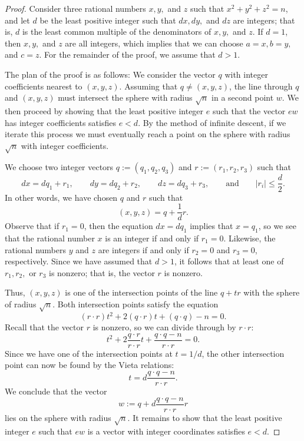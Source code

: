 \begin{proof}
  Consider three rational numbers $x, y,$ and $z$ such that $x^2+y^2+z^2=n$, and let $d$ be the least positive integer such that $dx, dy,$ and $dz$ are integers; that is, $d$ is the least common multiple of the denominators of $x, y,$ and $z$. If $d=1$, then $x, y,$ and $z$ are all integers, which implies that we can choose $a=x, b=y,$ and $c=z$. For the remainder of the proof, we assume that $d>1$.

  The plan of the proof is as follows: We consider the vector $q$ with integer coefficients nearest to $(x,y,z)$. Assuming that $q\neq (x,y,z)$, the line through $q$ and $(x,y,z)$ must intersect the sphere with radius $\sqrt{n}$ in a second point $w$. We then proceed by showing that the least positive integer $e$ such that the vector $ew$ has integer coefficients satisfies $e<d$. By the method of infinite descent, if we iterate this process we must eventually reach a point on the sphere with radius $\sqrt{n}$ with integer coefficients.

  We choose two integer vectors $q:=(q_1,q_2,q_3)$ and $r:=(r_1,r_2,r_3)$ such that
  \begin{equation*}
    dx=dq_1+r_1,\qquad dy=dq_2+r_2,\qquad dz=dq_3+r_3,\qquad\text{and}\qquad |r_i|\leq \frac{d}{2}.
  \end{equation*}
  In other words, we have chosen $q$ and $r$ such that
  \begin{equation*}
    (x,y,z)=q+\frac{1}{d}r.
  \end{equation*}
  Observe that if $r_1=0$, then the equation $dx=dq_1$ implies that $x=q_1$, so we see that the rational number $x$ is an integer if and only if $r_1=0$. Likewise, the rational numbers $y$ and $z$ are integers if and only if $r_2=0$ and $r_3=0$, respectively. Since we have assumed that $d>1$, it follows that at least one of $r_1, r_2,$ or $r_3$ is nonzero; that is, the vector $r$ is nonzero.
  
  Thus, $(x,y,z)$ is one of the intersection points of the line $q+tr$ with the sphere of radius $\sqrt{n}$. Both intersection points satisfy the equation
  \begin{equation*}
    (r\cdot r)t^2+2(q\cdot r)t+(q\cdot q)-n=0.
  \end{equation*}
  Recall that the vector $r$ is nonzero, so we can divide through by $r\cdot r$:
  \begin{equation*}
    t^2+2\frac{q\cdot r}{r\cdot r} t+\frac{q\cdot q-n}{r\cdot r}=0.
  \end{equation*}
  Since we have one of the intersection points at $t=1/d$, the other intersection point can now be found by the Vieta relations:
  \begin{equation*}
    t= d\frac{q\cdot q-n}{r\cdot r}.
  \end{equation*}
  We conclude that the vector
  \begin{equation*}
    w:= q+ d\frac{q\cdot q-n}{r\cdot r}r
  \end{equation*}
  lies on the sphere with radius $\sqrt{n}$. It remains to show that the least positive integer $e$ such that $ew$ is a vector with integer coordinates satisfies $e<d$. 


\end{proof}
